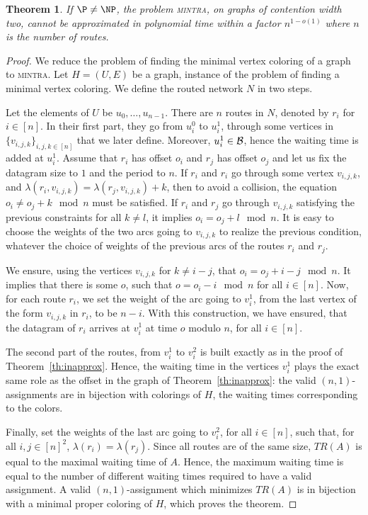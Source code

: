 \documentclass[a4paper,10pt]{journal}
\newtheorem{theorem}{Theorem}
\newcommand\mintra{\textsc{mintra}\xspace}
\begin{document}
\begin{theorem}
If $\P \neq \NP$, the problem \mintra, on graphs of contention width two, cannot be approximated in polynomial time within a factor $n^{1-o(1)}$ where $n$ is the number of routes.
\end{theorem}

\begin{proof}
We reduce the problem of finding the minimal vertex coloring of a graph to \mintra.
 Let $H = (U,E)$ be a graph, instance of the problem of finding a minimal vertex coloring. 
 We define the routed network $N$ in two steps. 

 Let the elements of $U$ be $u_0,\dots, u_{n-1}$. There are $n$ routes in $N$, denoted by $r_i$ for $i \in [n]$. In their first part, they go from $u_i^0$ to $u_i^1$, through some vertices in $\{v_{i,j,k}\}_{i,j,k \in [n]}$ that we later define. Moreover, $u_i^1 \in \cal{B}$, hence the waiting time is added at $u_i^1$. Assume that $r_i$ has offset $o_i$ and $r_j$ has offset $o_j$ and let us fix the datagram size to $1$ and the period to $n$. If $r_i$ and $r_i$ go through some vertex $v_{i,j,k}$, and  $\lambda(r_i,v_{i,j,k}) = \lambda(r_j,v_{i,j,k}) + k$, then to avoid a collision, the equation $o_i \neq o_j + k \mod n$ must be satisfied. If $r_i$ and $r_j$ go through $v_{i,j,k}$ satisfying the previous constraints for all $k \neq l$, it implies $o_i = o_j + l \mod n$. 
 It is easy to choose the weights of the two arcs going to $v_{i,j,k}$ to realize the previous condition, whatever the choice of weights of the previous arcs of the routes $r_i$ and $r_j$.

We ensure, using the vertices $v_{i,j,k}$ for $k \neq i-j$,
that $o_{i} = o_{j} + i - j \mod n$. It implies that there is some $o$, such that 
$ o = o_{i} - i \mod n$ for all $i \in [n]$. Now, for each route $r_i$, we set the weight of the
arc going to $v_i^1$, from the last vertex of the form $v_{i,j,k}$ in $r_i$, to be $n-i$.
With this construction, we have ensured, that the datagram of $r_i$ arrives at 
$v_i^1$ at time $o$ modulo $n$, for all $i \in [n]$. 

The second part of the routes, from $v_i^1$ to $v_i^2$ is built exactly as in the proof of Theorem~\ref{th:inapprox}. Hence, the waiting time in the vertices $v_i^1$ plays the exact same role as the offset in the graph of Theorem~\ref{th:inapprox}: the valid $(n,1)$-assignments are in bijection with colorings of $H$, the waiting times corresponding to the colors.

Finally, set the weights of the last arc going to $v_i^2$, for all $i \in [n]$, such that, for all $i,j \in [n]^2$, $\lambda(r_i) = \lambda(r_j)$.  Since all routes are of the same size, $TR(A)$ is equal to the maximal waiting time of $A$. Hence, the maximum waiting time is equal to the number of different waiting times required to have a valid assignment. A valid $(n,1)$-assignment which minimizes $TR(A)$ is in bijection with a minimal proper coloring of $H$, which proves the theorem.
\end{proof}
\end{document}
